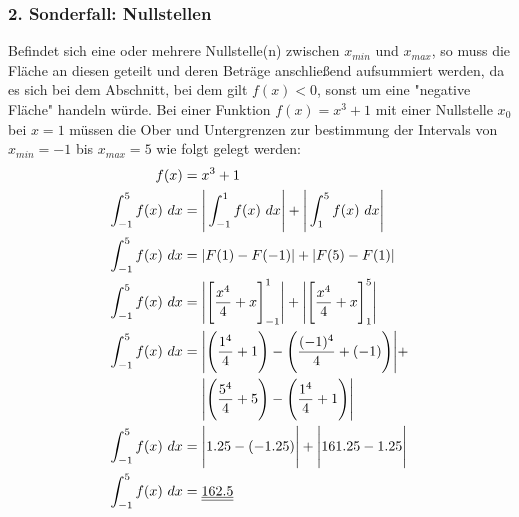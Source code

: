 \documentclass[a4paper,12pt]{article}
\begin{document}
\subsubsection{2. Sonderfall: Nullstellen}
Befindet sich eine oder mehrere Nullstelle(n) zwischen $x_{min}$ und $x_{max}$, so muss die Fläche an diesen geteilt und deren Beträge anschließend aufsummiert werden, 
da es sich bei dem Abschnitt, bei dem gilt $f(x) < 0$, sonst um eine "negative Fläche" handeln würde. Bei einer Funktion $f(x) = x^3 + 1$ mit einer Nullstelle 
$x_0$ bei $x = 1$ müssen die Ober und Untergrenzen zur bestimmung der Intervals von $x_{min} = -1$ bis $x_{max} = 5$ wie folgt gelegt werden:
\begin{equation}
\begin{split}
f(x) & = x^3 + 1\\
\int_{-1}^5 f(x)\ dx & = \Bigg{|} \int_{-1}^1 f(x)\ dx \Bigg{|} + \Bigg{|} \int_1^5 f(x)\ dx\Bigg{|}\\
\int_{-1}^5 f(x)\ dx & = | F(1) - F(-1) | + | F(5) - F(1) |\\
\int_{-1}^5 f(x)\ dx & = \Bigg{|}\Bigg{[}\frac{x^4}{4} + x\Bigg{]}_{-1}^1\Bigg{|} + \Bigg{|}\Bigg{[}\frac{x^4}{4} + x\Bigg{]}_1^5\Bigg{|}\\
\int_{-1}^5 f(x)\ dx & = \Bigg{|}\Bigg{(}\frac{1^4}{4} + 1\Bigg{)} - \Bigg{(}\frac{(-1)^4}{4} + (-1)\Bigg{)}\Bigg{|} + \\
&\ \ \ \ \Bigg{|}\Bigg{(}\frac{5^4}{4} + 5 \Bigg{)} - \Bigg{(}\frac{1^4}{4} + 1\Bigg{)}\Bigg{|}\\
\int_{-1}^5 f(x)\ dx & = \Bigg{|} 1.25 - (-1.25)\Bigg{|} + \Bigg{|} 161.25 - 1.25\Bigg{|}\\
\int_{-1}^5 f(x)\ dx & = \underline{\underline{162.5}}
\end{split}
\end{equation}
\pagebreak
\end{document}

